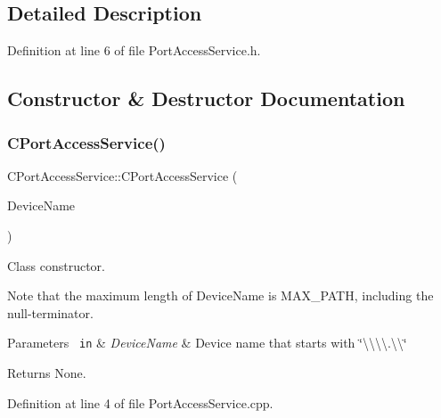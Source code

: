 \subsection{Detailed Description}


Definition at line 6 of file Port\+Access\+Service.\+h.



\subsection{Constructor \& Destructor Documentation}
\mbox{\label{class_c_port_access_service_a2e1907a99d94146144c8e0a0bba312d5}} 
\subsubsection{\texorpdfstring{CPortAccessService()}{CPortAccessService()}}
{\footnotesize\ttfamily C\+Port\+Access\+Service\+::\+C\+Port\+Access\+Service (\begin{DoxyParamCaption}\item[{L\+P\+W\+S\+TR}]{Device\+Name }\end{DoxyParamCaption})}



Class constructor. 

Note that the maximum length of Device\+Name is M\+A\+X\+\_\+\+P\+A\+TH, including the null-\/terminator.


\begin{DoxyParams}[1]{Parameters}
\mbox{\texttt{ in}}  & {\em Device\+Name} & Device name that starts with \char`\"{}\textbackslash{}\textbackslash{}\textbackslash{}\textbackslash{}.\textbackslash{}\textbackslash{}\char`\"{} \\
\hline
\end{DoxyParams}
\begin{DoxyReturn}{Returns}
None. 
\end{DoxyReturn}


Definition at line 4 of file Port\+Access\+Service.\+cpp.

\mbox{\label{class_c_port_access_service_a237d51c88c217e2e31626d1ab6a610c9}} 
